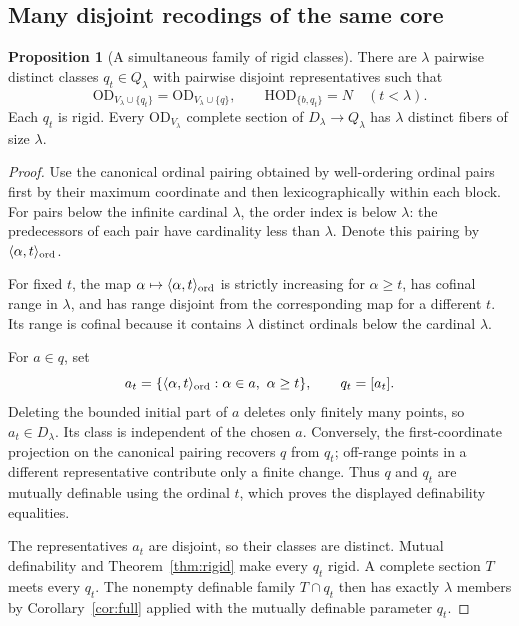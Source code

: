\documentclass[11pt,letterpaper]{article}
\theoremstyle{definition}
\newtheorem{proposition}[definition]{Proposition}
\numberwithin{equation}{section}
\newcommand{\HOD}{\mathrm{HOD}}
\newcommand{\OD}{\mathrm{OD}}
\begin{document}
\subsection{Many disjoint recodings of the same core}

\begin{proposition}[A simultaneous family of rigid classes]\label{prop:recodings}
There are $\lambda$ pairwise distinct classes $q_t\in Q_\lambda$ with pairwise disjoint representatives such that
\[
 \OD_{V_\lambda\cup\{q_t\}}=\OD_{V_\lambda\cup\{q\}},\qquad
 \HOD_{\{b,q_t\}}=N\quad(t<\lambda).
\]
Each $q_t$ is rigid. Every $\OD_{V_\lambda}$ complete section of $D_\lambda\to Q_\lambda$ has $\lambda$ distinct fibers of size $\lambda$.
\end{proposition}
\begin{proof}
Use the canonical ordinal pairing obtained by well-ordering ordinal pairs first by their maximum coordinate and then lexicographically within each block. For pairs below the infinite cardinal $\lambda$, the order index is below $\lambda$: the predecessors of each pair have cardinality less than $\lambda$. Denote this pairing by $\langle\alpha,t\rangle_{\rm ord}$.

For fixed $t$, the map $\alpha\mapsto\langle\alpha,t\rangle_{\rm ord}$ is strictly increasing for $\alpha\geq t$, has cofinal range in $\lambda$, and has range disjoint from the corresponding map for a different $t$. Its range is cofinal because it contains $\lambda$ distinct ordinals below the cardinal $\lambda$.

For $a\in q$, set
\[
 a_t=\{\langle\alpha,t\rangle_{\rm ord}:\alpha\in a,\ \alpha\geq t\},
 \qquad q_t=[a_t].
\]
Deleting the bounded initial part of $a$ deletes only finitely many points, so $a_t\in D_\lambda$. Its class is independent of the chosen $a$. Conversely, the first-coordinate projection on the canonical pairing recovers $q$ from $q_t$; off-range points in a different representative contribute only a finite change. Thus $q$ and $q_t$ are mutually definable using the ordinal $t$, which proves the displayed definability equalities.

The representatives $a_t$ are disjoint, so their classes are distinct. Mutual definability and Theorem~\ref{thm:rigid} make every $q_t$ rigid. A complete section $T$ meets every $q_t$. The nonempty definable family $T\cap q_t$ then has exactly $\lambda$ members by Corollary~\ref{cor:full} applied with the mutually definable parameter $q_t$.
\end{proof}
\end{document}
